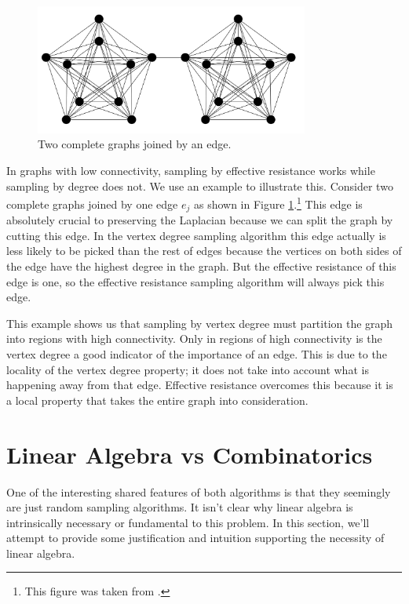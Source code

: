\documentclass[12pt,twoside]{article}
\begin{document}
\begin{figure}[ht!]
\centering
\includegraphics[width=90mm]{complete-graphs.png}
\caption{Two complete graphs joined by an edge.}
\label{complete-graphs}
\end{figure}


In graphs with low connectivity, sampling by effective resistance works while sampling by degree does not. We use an example to illustrate this. Consider two complete graphs joined by one edge $e_j$ as shown in Figure \ref{complete-graphs}.\footnote{This figure was taken from \cite{spielman-teng-spectralsparse}.} This edge is absolutely crucial to preserving the Laplacian because we can split the graph by cutting this edge. In the vertex degree sampling algorithm this edge actually is less likely to be picked than the rest of edges because the vertices on both sides of the edge have the highest degree in the graph. But the effective resistance of this edge is one, so the effective resistance sampling algorithm will always pick this edge. 

This example shows us that sampling by vertex degree must partition the graph into regions with high connectivity. Only in regions of high connectivity is the vertex degree a good indicator of the importance of an edge. This is due to the locality of the vertex degree property; it does not take into account what is happening away from that edge. Effective resistance overcomes this because it is a local property that takes the entire graph into consideration. 

\section{Linear Algebra vs Combinatorics}
One of the interesting shared features of both algorithms is that they seemingly are just random sampling algorithms. It isn't clear why linear algebra is intrinsically necessary or fundamental to this problem. In this section, we'll attempt to provide some justification and intuition supporting the necessity of linear algebra. 
\end{document}
